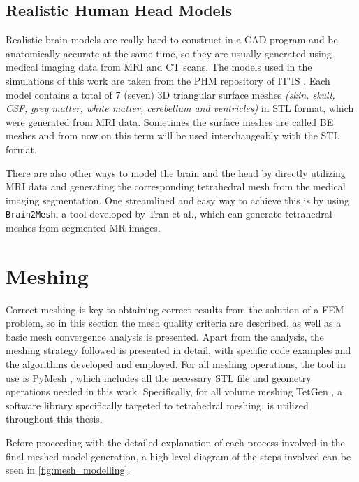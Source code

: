 \subsection{Realistic Human Head Models}
\label{sec:phm_models}

Realistic brain models are really hard to construct in a \gls{CAD} program and be anatomically accurate at the same time, so they are usually generated using medical imaging data from \gls{MRI} and \gls{CT} scans. The models used in the simulations of this work are taken from the \gls{PHM} repository of \gls{IT'IS} \cite{ErikG.Lee2016,Lee2018,ITstissue}. Each model contains a total of 7 (seven) 3D triangular surface meshes \textit{(skin, skull, \gls{CSF}, grey matter, white matter, cerebellum and ventricles)} in \gls{STL} format, which were generated from \gls{MRI} data. Sometimes the surface meshes are called \gls{BE} meshes and from now on this term will be used interchangeably with the \gls{STL} format.

There are also other ways to model the brain and the head by directly utilizing \gls{MRI} data and generating the corresponding tetrahedral mesh from the medical imaging segmentation. One streamlined and easy way to achieve this is by using \texttt{Brain2Mesh}, a tool developed by Tran et al.\cite{Tran2020}, which can generate tetrahedral meshes from segmented \gls{MR} images.

\section{Meshing}
\label{sec:fem_meshing}

Correct meshing is key to obtaining correct results from the solution of a \gls{FEM} problem, so in this section the mesh quality criteria are described, as well as a basic mesh convergence analysis is presented. Apart from the analysis, the meshing strategy followed is presented in detail, with specific code examples and the algorithms developed and employed. For all meshing operations, the tool in use is PyMesh \cite{pymesh}, which includes all the necessary \gls{STL} file and geometry operations needed in this work. Specifically, for all volume meshing TetGen \cite{tetgen}, a software library specifically targeted to tetrahedral meshing, is utilized throughout this thesis.

Before proceeding with the detailed explanation of each process involved in the final meshed model generation, a high-level diagram of the steps involved can be seen in \autoref{fig:mesh_modelling}.


